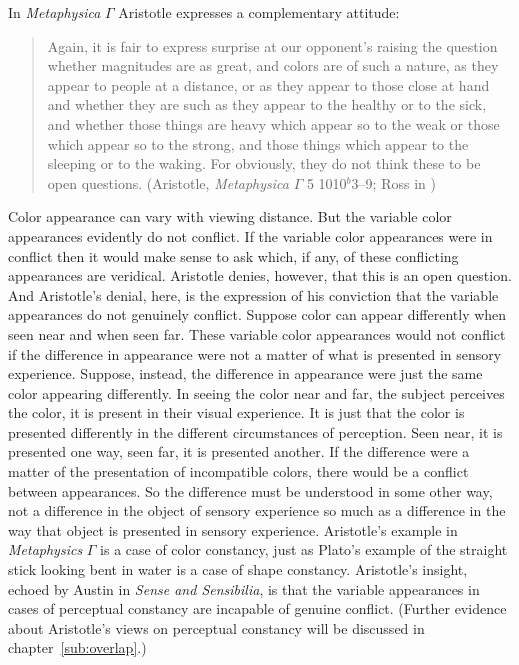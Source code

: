 In \emph{Metaphysica} \( \Gamma \) Aristotle expresses a complementary attitude:
\begin{quote}
	Again, it is fair to express surprise at our opponent's raising the question whether magnitudes are as great, and colors are of such a nature, as they appear to people at a distance, or as they appear to those close at hand and whether they are such as they appear to the healthy or to the sick, and whether those things are heavy which appear so to the weak or those which appear so to the strong, and those things which appear to the sleeping or to the waking. For obviously, they do not think these to be open questions. (Aristotle, \emph{Metaphysica} \( \Gamma \) 5 1010\( ^{b} \)3--9; Ross in \citealt[55]{Barnes:1984kx})
\end{quote}
Color appearance can vary with viewing distance. But the variable color appearances evidently do not conflict. If the variable color appearances were in conflict then it would make sense to ask which, if any, of these conflicting appearances are veridical. Aristotle denies, however, that this is an open question. And Aristotle's denial, here, is the expression of his conviction that the variable appearances do not genuinely conflict. Suppose color can appear differently when seen near and when seen far. These variable color appearances would not conflict if the difference in appearance were not a matter of what is presented in sensory experience. Suppose, instead, the difference in appearance were just the same color appearing differently. In seeing the color near and far, the subject perceives the color, it is present in their visual experience. It is just that the color is presented differently in the different circumstances of perception. Seen near, it is presented one way, seen far, it is presented another. If the difference were a matter of the presentation of incompatible colors, there would be a conflict between appearances. So the difference must be understood in some other way, not a difference in the object of sensory experience so much as a difference in the way that object is presented in sensory experience. Aristotle's example in \emph{Metaphysics} \( \Gamma \) is a case of color constancy, just as Plato's example of the straight stick looking bent in water is a case of shape constancy. Aristotle's insight, echoed by Austin in \emph{Sense and Sensibilia}, is that the variable appearances in cases of perceptual constancy are incapable of genuine conflict. (Further evidence about Aristotle's views on perceptual constancy will be discussed in chapter~\ref{sub:overlap}.)

